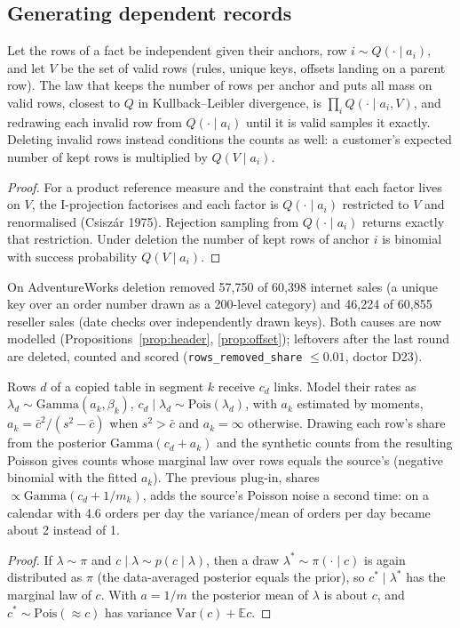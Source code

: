 \subsection{Generating dependent records}
\begin{proposition}\label{prop:refill}
Let the rows of a fact be independent given their anchors, row $i\sim Q(\cdot\mid a_i)$, and let $V$ be the set of valid rows (rules, unique keys, offsets landing on a parent row). The law that keeps the number of rows per anchor and puts all mass on valid rows, closest to $Q$ in Kullback--Leibler divergence, is $\prod_iQ(\cdot\mid a_i,V)$, and redrawing each invalid row from $Q(\cdot\mid a_i)$ until it is valid samples it exactly. Deleting invalid rows instead conditions the counts as well: a customer's expected number of kept rows is multiplied by $Q(V\mid a_i)$.
\end{proposition}
\begin{proof}
For a product reference measure and the constraint that each factor lives on $V$, the I-projection factorises and each factor is $Q(\cdot\mid a_i)$ restricted to $V$ and renormalised (Csisz\'ar 1975). Rejection sampling from $Q(\cdot\mid a_i)$ returns exactly that restriction. Under deletion the number of kept rows of anchor $i$ is binomial with success probability $Q(V\mid a_i)$.
\end{proof}
\noindent On AdventureWorks deletion removed 57{,}750 of 60{,}398 internet sales (a unique key over an order number drawn as a 200-level category) and 46{,}224 of 60{,}855 reseller sales (date checks over independently drawn keys). Both causes are now modelled (Propositions~\ref{prop:header}, \ref{prop:offset}); leftovers after the last round are deleted, counted and scored (\texttt{rows\_removed\_share} $\le0.01$, doctor D23).

\begin{proposition}\label{prop:shares}
Rows $d$ of a copied table in segment $k$ receive $c_d$ links. Model their rates as $\lambda_d\sim\mathrm{Gamma}(a_k,\beta_k)$, $c_d\mid\lambda_d\sim\mathrm{Pois}(\lambda_d)$, with $a_k$ estimated by moments, $a_k=\bar c^2/(s^2-\bar c)$ when $s^2>\bar c$ and $a_k=\infty$ otherwise. Drawing each row's share from the posterior $\mathrm{Gamma}(c_d+a_k)$ and the synthetic counts from the resulting Poisson gives counts whose marginal law over rows equals the source's (negative binomial with the fitted $a_k$). The previous plug-in, shares $\propto\mathrm{Gamma}(c_d+1/m_k)$, adds the source's Poisson noise a second time: on a calendar with 4.6 orders per day the variance/mean of orders per day became about 2 instead of 1.
\end{proposition}
\begin{proof}
If $\lambda\sim\pi$ and $c\mid\lambda\sim p(c\mid\lambda)$, then a draw $\lambda^*\sim\pi(\cdot\mid c)$ is again distributed as $\pi$ (the data-averaged posterior equals the prior), so $c^*\mid\lambda^*$ has the marginal law of $c$. With $a=1/m$ the posterior mean of $\lambda$ is about $c$, and $c^*\sim\mathrm{Pois}(\approx c)$ has variance $\mathrm{Var}(c)+\mathbb E c$.
\end{proof}

